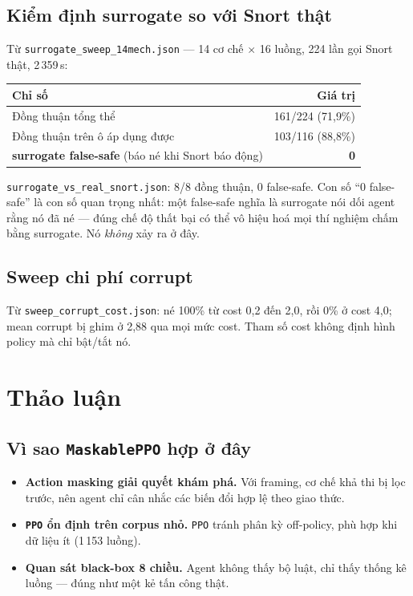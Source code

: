 \documentclass[12pt,a4paper]{report}
\newcommand{\PPO}{\texttt{PPO}}
\begin{document}
\section{Kiểm định surrogate so với Snort thật}

Từ \texttt{surrogate\_sweep\_14mech.json} — 14 cơ chế $\times$ 16 luồng, 224 lần gọi
Snort thật, 2\,359\,s:

\begin{center}
\begin{tabular}{lr}
\toprule
Chỉ số & Giá trị \\
\midrule
Đồng thuận tổng thể & 161/224 (71{,}9\%) \\
Đồng thuận trên ô áp dụng được & 103/116 (88{,}8\%) \\
\textbf{surrogate false-safe} (báo né khi Snort báo động) & \textbf{0} \\
\bottomrule
\end{tabular}
\end{center}
\texttt{surrogate\_vs\_real\_snort.json}: 8/8 đồng thuận, 0 false-safe. Con số ``0
false-safe'' là con số quan trọng nhất: một false-safe nghĩa là surrogate nói dối
agent rằng nó đã né — đúng chế độ thất bại có thể vô hiệu hoá mọi thí nghiệm chấm bằng
surrogate. Nó \emph{không} xảy ra ở đây.

\section{Sweep chi phí corrupt}
Từ \texttt{sweep\_corrupt\_cost.json}: né 100\% từ cost 0{,}2 đến 2{,}0, rồi 0\% ở
cost 4{,}0; mean corrupt bị ghim ở 2{,}88 qua mọi mức cost. Tham số cost không định
hình policy mà chỉ bật/tắt nó.

\chapter{Thảo luận}
\label{ch:discussion}

\section{Vì sao \texttt{MaskablePPO} hợp ở đây}

\begin{itemize}
  \item \textbf{Action masking giải quyết khám phá.} Với framing, cơ chế khả thi bị
        lọc trước, nên agent chỉ cân nhắc các biến đổi hợp lệ theo giao thức.
  \item \textbf{\PPO{} ổn định trên corpus nhỏ.} \PPO{} tránh phân kỳ off-policy, phù
        hợp khi dữ liệu ít (1\,153 luồng).
  \item \textbf{Quan sát black-box 8 chiều.} Agent không thấy bộ luật, chỉ thấy thống
        kê luồng — đúng như một kẻ tấn công thật.
\end{itemize}
\end{document}
